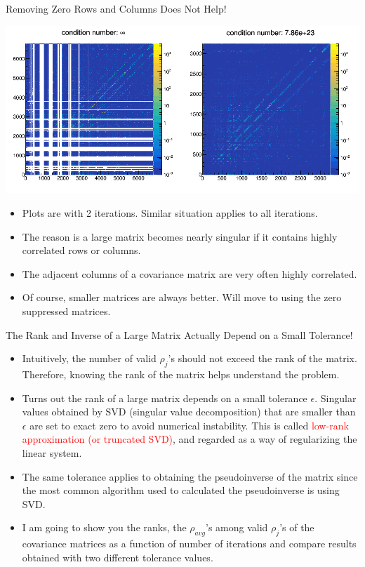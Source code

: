 \documentclass[aspectratio=169]{beamer}
\begin{document}
\begin{frame}{Removing Zero Rows and Columns Does Not Help!}
  \begin{center}
    \includegraphics[height=.6\textheight]{figures/iter2tol1e-15.png}
  \end{center}
  \begin{itemize}
    \scriptsize
    \item Plots are with 2 iterations. Similar situation applies to all iterations.
    \item The reason is a large matrix becomes nearly singular if it contains highly correlated rows or columns. 
    \item The adjacent columns of a covariance matrix are very often highly correlated.
    \item Of course, smaller matrices are always better. Will move to using the zero suppressed matrices.
  \end{itemize}
\end{frame}

\begin{frame}{The Rank and Inverse of a Large Matrix Actually Depend on a Small Tolerance!}
  \begin{itemize}
    \item Intuitively, the number of valid $\rho_j$'s should not exceed the rank of the matrix. Therefore, knowing the rank of the matrix helps understand the problem.
    \item Turns out the rank of a large matrix depends on a small tolerance $\epsilon$. Singular values obtained by SVD (singular value decomposition) that are smaller than $\epsilon$ are set to exact zero to avoid numerical instability. This is called \textcolor{red}{low-rank approximation (or truncated SVD)}, and regarded as a way of regularizing the linear system.
    \item The same tolerance applies to obtaining the pseudoinverse of the matrix since the most common algorithm used to calculated the pseudoinverse is using SVD.
    \item I am going to show you the ranks, the $\rho_{avg}$'s among valid $\rho_j$'s of the covariance matrices as a function of number of iterations and compare results obtained with two different tolerance values.
  \end{itemize}
\end{frame}
\end{document}
